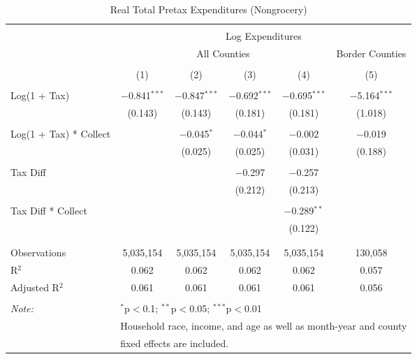 
\begin{table}[!htbp] \centering 
  \caption{Real Total Pretax Expenditures (Nongrocery)} 
  \label{} 
\begin{tabular}{@{\extracolsep{5pt}}lccccc} 
\\[-1.8ex]\hline 
\hline \\[-1.8ex] 
 & \multicolumn{5}{c}{Log Expenditures} \\ 
\cline{2-6} 
 & \multicolumn{4}{c}{All Counties} & Border Counties \\ 
\\[-1.8ex] & (1) & (2) & (3) & (4) & (5)\\ 
\hline \\[-1.8ex] 
 Log(1 + Tax) & $-$0.841$^{***}$ & $-$0.847$^{***}$ & $-$0.692$^{***}$ & $-$0.695$^{***}$ & $-$5.164$^{***}$ \\ 
  & (0.143) & (0.143) & (0.181) & (0.181) & (1.018) \\ 
  & & & & & \\ 
 Log(1 + Tax) * Collect &  & $-$0.045$^{*}$ & $-$0.044$^{*}$ & $-$0.002 & $-$0.019 \\ 
  &  & (0.025) & (0.025) & (0.031) & (0.188) \\ 
  & & & & & \\ 
 Tax Diff &  &  & $-$0.297 & $-$0.257 &  \\ 
  &  &  & (0.212) & (0.213) &  \\ 
  & & & & & \\ 
 Tax Diff * Collect &  &  &  & $-$0.289$^{**}$ &  \\ 
  &  &  &  & (0.122) &  \\ 
  & & & & & \\ 
\hline \\[-1.8ex] 
Observations & 5,035,154 & 5,035,154 & 5,035,154 & 5,035,154 & 130,058 \\ 
R$^{2}$ & 0.062 & 0.062 & 0.062 & 0.062 & 0.057 \\ 
Adjusted R$^{2}$ & 0.061 & 0.061 & 0.061 & 0.061 & 0.056 \\ 
\hline 
\hline \\[-1.8ex] 
\textit{Note:}  & \multicolumn{5}{l}{$^{*}$p$<$0.1; $^{**}$p$<$0.05; $^{***}$p$<$0.01} \\ 
 & \multicolumn{5}{l}{Household race, income, and age as well as month-year and county} \\ 
 & \multicolumn{5}{l}{fixed effects are included.} \\ 
\end{tabular} 
\end{table} 
